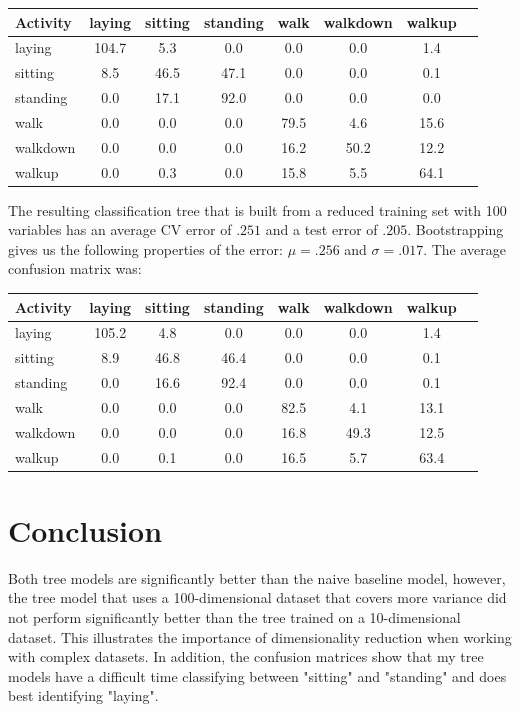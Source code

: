 \documentclass[paper=a4, fontsize=11pt]{scrartcl} %
\numberwithin{equation}{section} %
\numberwithin{figure}{section} %
\numberwithin{table}{section} %
\begin{document}
\begin{center}
\begin{tabular}{l*{6}{c}r}
Activity              & laying & sitting & standing & walk & walkdown  & walkup \\
\hline
laying & 104.7 & 5.3 & 0.0 & 0.0 & 0.0 & 1.4 \\
sitting &  8.5 & 46.5 & 47.1 & 0.0 & 0.0 & 0.1 \\
standing &  0.0 & 17.1 & 92.0 & 0.0 & 0.0 & 0.0 \\
walk    &  0.0 & 0.0 & 0.0 & 79.5 & 4.6 & 15.6 \\
walkdown & 0.0 & 0.0 & 0.0 & 16.2 & 50.2 & 12.2 \\
walkup & 0.0 & 0.3 & 0.0 & 15.8 & 5.5 & 64.1 \\
\end{tabular}
\end{center}

The resulting classification tree that is built from a reduced training set with 100
variables has an average CV error of $.251$ and a test error of $.205$. Bootstrapping gives
us the following properties of the error: $\mu = .256 $ and $\sigma = .017$. The average confusion
matrix was:
\begin{center}
\begin{tabular}{l*{6}{c}r}
Activity & laying & sitting & standing & walk & walkdown  & walkup \\
\hline
laying & 105.2 & 4.8 & 0.0 & 0.0 & 0.0 & 1.4 \\
sitting &  8.9 & 46.8 & 46.4 & 0.0 & 0.0 & 0.1 \\
standing &  0.0 & 16.6 & 92.4 & 0.0 & 0.0 & 0.1\\
walk    &  0.0 & 0.0 & 0.0 & 82.5 & 4.1 & 13.1\\
walkdown &  0.0 & 0.0 & 0.0 & 16.8 & 49.3 & 12.5\\
walkup &  0.0 & 0.1 & 0.0 & 16.5 & 5.7 & 63.4\\
\end{tabular}
\end{center}

\section{Conclusion}
Both tree models are significantly better than the naive baseline model, however, the 
tree model that uses a 100-dimensional dataset that covers more variance did not perform
significantly better than the tree trained on a 10-dimensional dataset. This illustrates
the importance of dimensionality reduction when working with complex datasets. 
In addition, the confusion matrices show that my tree models have a difficult time
classifying between "sitting" and "standing" and does best identifying "laying".
\end{document}
